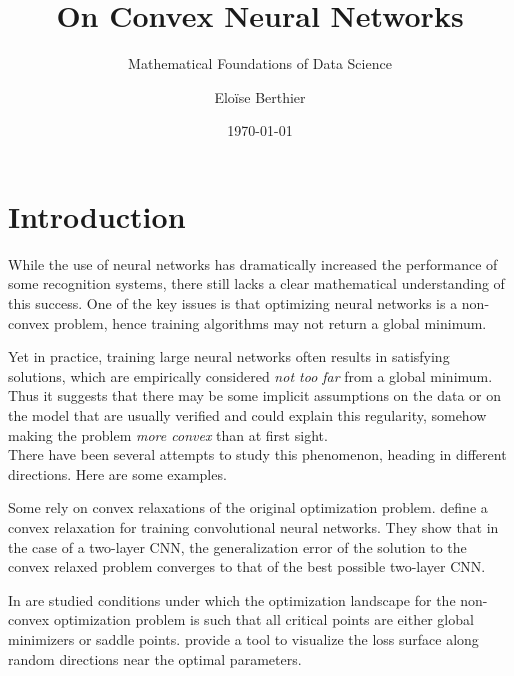 \documentclass[a4paper, 11pt]{scrartcl}
\title{On Convex Neural Networks}
\author{Eloïse Berthier}
\date{\today}
\subtitle{Mathematical Foundations of Data Science}
\begin{document}
\setcounter{secnumdepth}{3}
\setlength{\parindent}{0cm}

\maketitle

\everymath{\displaystyle}


\newpage


\section{Introduction}

While the use of neural networks has dramatically increased the performance of some recognition systems, there still lacks a clear mathematical understanding of this success. One of the key issues is that optimizing neural networks is a non-convex problem, hence training algorithms may not return a global minimum.

Yet in practice, training large neural networks often results in satisfying solutions, which are empirically considered \textit{not too far} from a global minimum. Thus it suggests that there may be some implicit assumptions on the data or on the model that are usually verified and could explain this regularity, somehow making the problem \textit{more convex} than at first sight.\\

There have been several attempts to study this phenomenon, heading in different directions. Here are some examples.

Some rely on convex relaxations of the original optimization problem. \cite{zhang2016convexified} define a convex relaxation for training convolutional neural networks. They show that in the case of a two-layer CNN, the generalization error of the solution to the convex relaxed problem converges to that of the best possible two-layer CNN.

In \cite{haeffele2017global} are studied conditions under which the optimization landscape for the non-convex optimization problem is such that all critical points are either global minimizers or saddle points. \cite{visualloss} provide a tool to visualize the loss surface along random directions near the optimal parameters.
\end{document}
